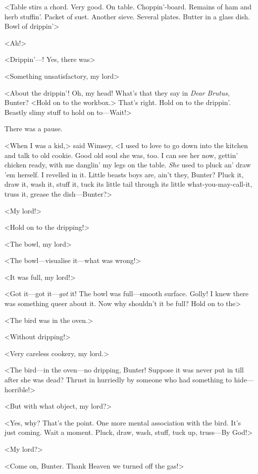 <Table stirs a chord. Very good. On table. Choppin'-board. Remains of ham and herb stuffin'. Packet of suet. Another sieve. Several plates. Butter in a glass dish. Bowl of drippin'\longdash>

<Ah!>

<Drippin'—! Yes, there was\longdash>

<Something unsatisfactory, my lord\longdash>

<About the drippin'! Oh, my head! What's that they say in \textit{Dear Brutus}, Bunter? <Hold on to the workbox.> That's right. Hold on to the drippin'. Beastly slimy stuff to hold on to—Wait!>

There was a pause.

<When I was a kid,> said Wimsey, <I used to love to go down into the kitchen and talk to old cookie. Good old soul she was, too. I can see her now, gettin' chicken ready, with me danglin' my legs on the table. \textit{She} used to pluck an' draw 'em herself. I revelled in it. Little beasts boys are, ain't they, Bunter? Pluck it, draw it, wash it, stuff it, tuck its little tail through its little what-you-may-call-it, truss it, grease the dish—Bunter?>

<My lord!>

<Hold on to the dripping!>

<The bowl, my lord\longdash>

<The bowl—visualise it—what was wrong!>

<It was full, my lord!>

<Got it—got it—\textit{got} it! The bowl was full—smooth surface. Golly! I knew there was something queer about it. Now why shouldn't it be full? Hold on to the\longdash>

<The bird was in the oven.>

<Without dripping!>

<Very careless cookery, my lord.>

<The bird—in the oven—no dripping, Bunter! Suppose it was never put in till after she was dead? Thrust in hurriedly by someone who had something to hide—horrible!>

<But with what object, my lord?>

<Yes, why? That's the point. One more mental association with the bird. It's just coming. Wait a moment. Pluck, draw, wash, stuff, tuck up, truss—By God!>

<My lord?>

<Come on, Bunter. Thank Heaven we turned off the gas!>

